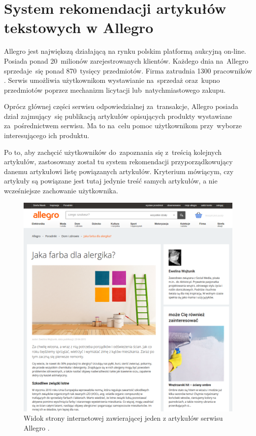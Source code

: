 \documentclass[pl]{minipw} %
\begin{document}
\section{System rekomendacji artykułów tekstowych w Allegro}%
Allegro jest największą \cite{all_naj} działającą na rynku polskim platformą aukcyjną on-line. Posiada ponad 20~milionów zarejestrowanych klientów. Każdego dnia na~Allegro sprzedaje~się ponad 870~tysięcy przedmiotów. Firma zatrudnia 1300 pracowników \cite{allegro}. Serwis umożliwia użytkownikom wystawianie na~sprzedaż oraz~kupno przedmiotów poprzez mechanizm licytacji lub~natychmiastowego zakupu.

Oprócz głównej części serwisu odpowiedzialnej za~transakcje, Allegro posiada dział zajmujący~się publikacją artykułów opisujących produkty wystawiane za~pośrednictwem serwisu. Ma to na~celu pomoc użytkownikom przy~wyborze interesującego ich produktu.

Po to, aby zachęcić użytkowników do~zapoznania się z~treścią kolejnych artykułów, zastosowany został tu system rekomendacji przyporządkowujący danemu artykułowi listę powiązanych artykułów. Kryterium mówiącym, czy artykuły są powiązane jest tutaj jedynie treść samych artykułów, a nie wcześniejsze zachowanie użytkownika.

\begin{figure}[H]
	\centering
	\includegraphics[width=1\textwidth]{img/screen_allegro.png}
	\caption{Widok strony internetowej zawierającej jeden z artykułów serwisu Allegro \cite{screen_allegro}.}
\end{figure}
\end{document}
